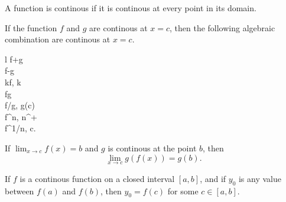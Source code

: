 \documentclass{article}
\begin{document}
\begin{definition}
	A function is continous if it is continous at every point in its domain.
\end{definition}
\begin{theorem}
	If the function \(f\) and \(g\) are continous at \(x=c\), then the following algebraic combination are continous at \(x=c\).
	\begin{IEEEeqnarray*}{l}
		f+g\\
		f-g\\
		k\cdot f,\; k\in{}\\
		f\cdot g\\
		f/g,\; g(c)\\
		f^n,\; n\in{}^+\\
		f^{1/n},\; c.
	\end{IEEEeqnarray*}
\end{theorem}
\begin{theorem}
	If \(\lim_{x\rightarrow c}f(x)=b\) and \(g\) is continous at the point \(b\), then
	\begin{equation*}
		\lim_{x\rightarrow c}g(f(x))=g(b).
	\end{equation*}
\end{theorem}
\begin{theorem}
	If \(f\) is a continous function on a closed interval \([a,b]\), and if \(y_0\) is any value between \(f(a)\) and \(f(b)\), then \(y_0=f(c)\) for some \(c\in[a,b]\).
\end{theorem}
\end{document}
